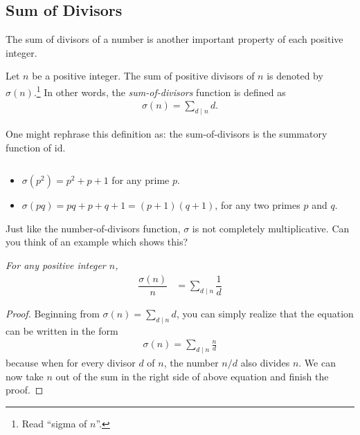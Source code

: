 \documentclass[12pt]{subfile}
\begin{document}
	\subsection{Sum of Divisors}\label{sec:sum-of-divisors}
		The sum of divisors of a number is another important property of each positive integer.

		\begin{definition}
			Let $n$ be a positive integer. The sum of positive divisors of $n$ is denoted by $\sigma(n)$.\footnote{Read ``sigma of $n$''.} In other words, the \textit{sum-of-divisors} function is defined as
			\begin{align*}
			\sigma(n)=\sum_{d\mid n} d.
			\end{align*}
		\end{definition}

		\begin{note}
			One might rephrase this definition as: the sum-of-divisors is the summatory function of $\text{id}$.
		\end{note}

		\begin{example}
			$ $
			\begin{itemize}
				\item $\sigma(p^2) = p^2+p+1$ for any prime $p$.
				\item $\sigma(pq)=pq+p+q+1=(p+1)(q+1)$, for any two primes $p$ and $q$.
			\end{itemize}
		\end{example}



		\begin{note}
			Just like the number-of-divisors function, $\sigma$ is not completely multiplicative. Can you think of an example which shows this?
		\end{note}

		\begin{theorem}\slshape\label{thm:sodfrac}
			For any positive integer $n$,
				\begin{align*}
					\dfrac{\sigma (n)}{n} & = \sum_{d\mid n}\dfrac{1}{d}
				\end{align*}
		\end{theorem}

		\begin{proof}
			Beginning from $\sigma(n) = \sum\limits_{d\mid n} d$, you can simply realize that the equation can be written in the form
			\begin{align*}
			\sigma(n) = \sum_{d\mid n} \frac{n}{d}
			\end{align*}
			because when for every divisor $d$ of $n$, the number $n/d$ also divides $n$. We can now take $n$ out of the sum in the right side of above equation and finish the proof.
		\end{proof}
\end{document}
